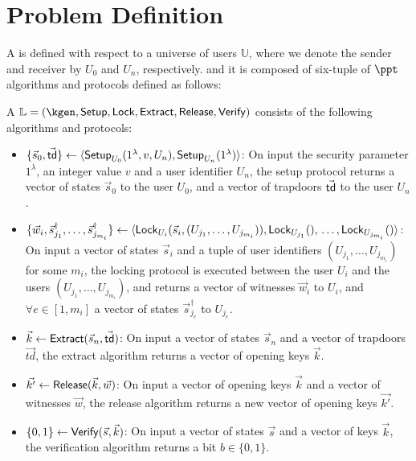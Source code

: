 \section{Problem Definition}



A \sysname is defined with respect to a universe of users $\mathbb{U}$, where we denote the sender and 
receiver by $U_0$ and $U_n$, respectively. and it is composed of six-tuple of $\ppt$ algorithms and 
protocols defined as follows:

\begin{definition}
A \sysname $\mathbb{L} = (\kgen, \Setup, \Lock, \Extract, \Release,\\ \Verify)$ consists of the 
following algorithms and protocols:

\begin{itemize}[leftmargin=15pt] %
	\item $\{\vec{s}_0, \vec{\mathsf{td}}\} \gets \langle \mathsf{Setup}_{U_0}(1^\lambda, v, U_n),\mathsf{Setup}_{U_n}(1^\lambda) 
	\rangle$: On input the security parameter $1^\lambda$, an integer value $v$ and a user identifier 
	$U_n$, the setup protocol returns a vector of states $\vec{s}_0$ to the user $U_0$, and a vector 
	of trapdoors $\vec{\mathsf{td}}$ to the user $U_n$.
	
	\item $\{\vec{w}_i,\vec{s}_{j_1}^\dag,\ldots,\vec{s}_{j_{m_i}}^\dag\} \gets \langle 
	\mathsf{Lock}_{U_i}(\vec{s}_i, (U_{j_1},\ldots,U_{j_{m_i}})), \mathsf{Lock}_{U_{j_1}}(),\\ \ldots, \mathsf{Lock}_{U_{j_{m_i}}}() 
	\rangle$: On input a vector of states $\vec{s}_i$ and a tuple of user identifiers $(U_{j_1},\ldots,
	U_{j_{m_i}})$ for some $m_i$, the locking protocol is executed between the user $U_i$ and the users 
	$(U_{j_1},\ldots,U_{j_{m_i}})$, and returns a vector of witnesses $\vec{w}_i$ to $U_i$, and $\forall e 
	\in [1,m_i]$ a vector of states $\vec{s}_{j_e}^\dag$ to $U_{j_e}$.
	
	\item $\vec{k} \gets \mathsf{Extract}(\vec{s}_n,\vec{\mathsf{td}})$: On input a vector of states $\vec{s}_n$ and a 
	vector of trapdoors $\vec{td}$, the extract algorithm returns a vector of opening keys $\vec{k}$.
	
	\item $\vec{k'} \gets \mathsf{Release}(\vec{k},\vec{w})$: On input a vector of opening keys $\vec{k}$ and a 
	vector of witnesses $\vec{w}$, the release algorithm returns a new vector of opening keys $\vec{k'}$.
	
	\item $\{0,1\} \gets \mathsf{Verify}(\vec{s}, \vec{k})$: On input a vector of states $\vec{s}$ and a vector 
	of keys $\vec{k}$, the verification algorithm returns a bit $b \in \{0,1\}$.
\end{itemize}
\end{definition}

